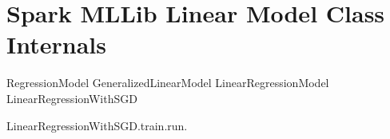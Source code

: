 
\section{Spark MLLib Linear Model Class Internals}
 
RegressionModel
GeneralizedLinearModel
LinearRegressionModel
LinearRegressionWithSGD










LinearRegressionWithSGD.train.run.
